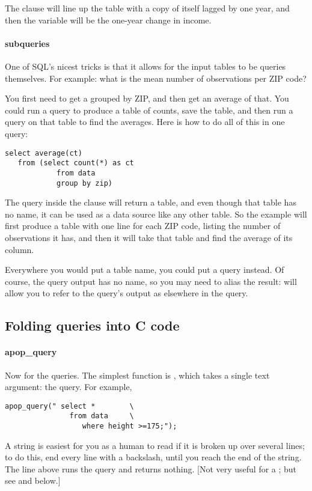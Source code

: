 The  clause will line up the table with a copy of itself
lagged by one year, and then the  variable will be the
one-year change in income.


\paragraph{subqueries}

One of SQL's nicest tricks is that it allows for the input tables to be
queries themselves. For example: what is the mean number of observations per
ZIP code?

You first need to get a  grouped by ZIP, and then get an
average of that. You could run a query to produce a table of counts,
save the table, and then run a query on that table to find the averages.
Here is how to do all of this in one query: 
\begin{lstlisting}
select average(ct) 
   from (select count(*) as ct
            from data
            group by zip)
\end{lstlisting}
The query inside the  clause will return a table, and even
though that table has no name, it can be used as a data source like any other
table. So the example will first produce a table with one line for each
ZIP code, listing the number of observations it has, and then it will
take that table and find the average of its  column.

Everywhere you would put a table name, you could put a query 
instead. Of course, the query output has no name, so you may need to
alias the result:  will allow you to refer to
the query's output as  elsewhere in the query.

\subsection{Folding queries into C code} 


\paragraph{apop\_query} Now for the queries. The simplest function
is , which takes a single text argument: the
query. For example,

\begin{lstlisting}
apop_query(" select *        \
               from data     \
                  where height >=175;");
\end{lstlisting}
A string is easiest for you as a human to read if it is
broken up over several lines; to do this, end every line with a
backslash, until you reach the end of the string. The line above runs
the query and returns nothing. [Not very useful for a ; but see
\sinline{create} and  \sinline{insert} below.]

